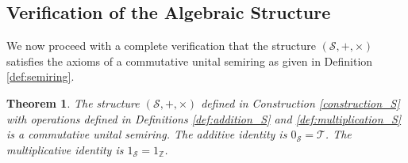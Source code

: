\documentclass[11pt, a4paper]{article}
\theoremstyle{plain}
\newtheorem{theorem}{Theorem}[section]
\theoremstyle{definition}
\numberwithin{equation}{section}
\newcommand{\Z}{\mathbb{Z}}
\newcommand{\Tobj}{\mathcal{T}} %
\newcommand{\SemiringS}{\mathcal{S}}
\begin{document}
\subsection{Verification of the Algebraic Structure}

We now proceed with a complete verification that the structure $(\SemiringS, +, \times)$ satisfies the axioms of a commutative unital semiring as given in Definition \ref{def:semiring}.

\begin{theorem}\label{thm:S_is_semiring}
The structure $(\SemiringS, +, \times)$ defined in Construction \ref{construction_S} with operations defined in Definitions \ref{def:addition_S} and \ref{def:multiplication_S} is a commutative unital semiring. The additive identity is $0_{\SemiringS}=\Tobj$. The multiplicative identity is $1_{\SemiringS}=1_{\Z}$.
\end{theorem}
\end{document}

